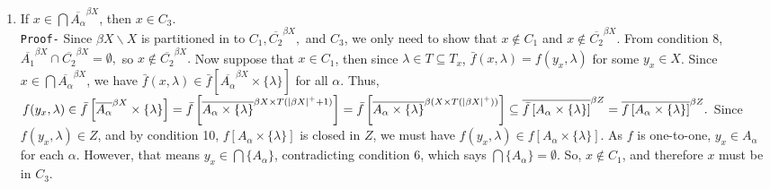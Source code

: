 \documentclass{article}
\begin{document}
\begin{enumerate}
																																																			\item If $x\in \bigcap \overline{A_\alpha}^{\beta X}$, then $x\in C_3.$\\
																																																			    \texttt{Proof-} Since $\beta X\backslash X$ is partitioned in to $C_1, \overline{C_2}^{\beta X},$ and $C_3$, we only need to show that $x\notin C_1$ and $x\notin \overline{C_2}^{\beta X}.$ From condition 8, $\overline{A_1}^{\beta X} \cap \overline{C_2}^{\beta X}=\emptyset,$ so $x\notin \overline{C_2}^{\beta X}.$  Now suppose that $x\in C_1$, then since $\lambda \in T \subseteq T_x$, $\bar{f}(x,\lambda)=f(y_x,\lambda)$ for some $y_x\in X$. Since $x\in \bigcap \overline{A_\alpha}^{\beta X}$, we have $\bar{f}(x,\lambda)\in \bar{f}\left[\overline{A_\alpha}^{\beta X}\times \{\lambda\}\right]$ for all $\alpha$. Thus, $f(y_x,\lambda)\in \bar{f}\left[\overline{A_\alpha}^{\beta X}\times \{\lambda\}\right]=\\ \bar{f}\left[\overline{A_\alpha \times \{\lambda\}}^{\beta X\times T(|\beta X|^+ +1)}\right]=\bar{f}\left[\overline{A_\alpha \times \{\lambda\}}^{\beta (X\times T(|\beta X|^+ ))}\right]\subseteq \overline{\bar{f}\left[A_\alpha \times \{\lambda\}\right]}^{\beta Z}\\
																																																			    =\overline{f\left[A_\alpha \times \{\lambda\}\right]}^{\beta Z}.$	              
																																																			    Since $f(y_x,\lambda)\in Z$, and by condition 10, $f\left[A_\alpha\times\{\lambda\}\right]$ is closed in $Z$, we must have $f(y_x,\lambda)\in f\left[A_\alpha\times\{\lambda\}\right]$. As $f$ is one-to-one, $y_x\in A_\alpha$ for each $\alpha$. However, that means $y_x\in \bigcap \{A_\alpha\}$, contradicting condition 6, which says $\bigcap \{A_\alpha\}=\emptyset$. So, $x\notin C_1$, and therefore $x$ must be in $C_3$. 


																																																			    \vskip 20pt



\end{enumerate}
\end{document}
